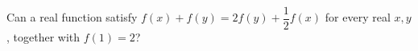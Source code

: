Can a real function satisfy $f(x)+f(y)=2f(y)+\dfrac{1}{2}f(x)$ for every real $x,y$, together with $f(1)=2$?
